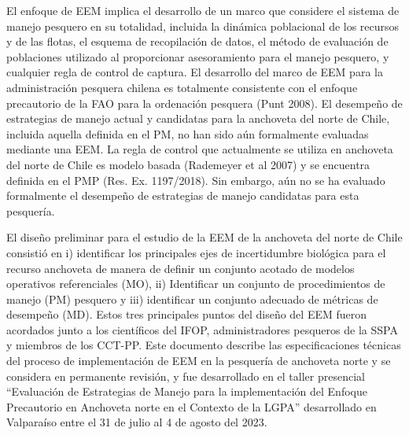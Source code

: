 El enfoque de EEM implica el desarrollo de un marco que considere el sistema de manejo pesquero en su totalidad, incluida la dinámica poblacional de los recursos y de las flotas, el esquema de recopilación de datos, el método de evaluación de poblaciones utilizado al proporcionar asesoramiento para el manejo pesquero, y cualquier regla de control de captura. El desarrollo del marco de EEM para la administración pesquera chilena es totalmente consistente con el enfoque precautorio de la FAO para la ordenación pesquera (Punt 2008). El desempeño de estrategias de manejo actual y candidatas para la anchoveta del norte de Chile, incluida aquella definida en el PM, no han sido aún formalmente evaluadas mediante una EEM. La regla de control que actualmente se utiliza en anchoveta del norte de Chile es modelo basada (Rademeyer et al 2007) y se encuentra definida en el PMP (Res. Ex. 1197/2018). Sin embargo, aún no se ha evaluado formalmente el desempeño de estrategias de manejo candidatas para esta pesquería.
\newline

El diseño preliminar para el estudio de la EEM de la anchoveta del norte de Chile consistió en i) identificar los principales ejes de incertidumbre biológica para el recurso anchoveta de manera de definir un conjunto acotado de modelos operativos referenciales (MO), ii) Identificar un conjunto de procedimientos de manejo (PM) pesquero y iii) identificar un conjunto adecuado de métricas de desempeño (MD). Estos tres principales puntos del diseño del EEM fueron acordados junto a los científicos del IFOP, administradores pesqueros de la SSPA y miembros de los CCT-PP. Este documento describe las especificaciones técnicas del proceso de implementación de EEM en la pesquería de anchoveta norte y se considera en permanente revisión, y fue desarrollado en el taller presencial “Evaluación de Estrategias de Manejo para la implementación del Enfoque Precautorio en Anchoveta norte en el Contexto de la LGPA” desarrollado en Valparaíso entre el 31 de julio al 4 de agosto del 2023.

